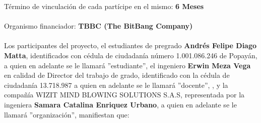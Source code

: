 Término de vinculación de cada partícipe en el mismo: \textbf{6 Meses} \\ \\

Organismo financiador: \textbf{TBBC (The BitBang Company)} \\ \\


Los participantes del proyecto, el estudiantes de pregrado \textbf{Andrés Felipe Diago Matta}, identificados con cédula de ciudadanía número 1.001.086.246 de Popayán, a quien en adelante se le llamará ''estudiante'', el ingeniero \textbf{Erwin Meza Vega} en calidad de Director del trabajo de grado, identificado con la cédula de ciudadanía 13.718.987 a quien en adelante se le llamará ''docente'', , y la compañía WIZIT MIND BLOWING SOLUTIONS S.A.S, representada por la ingeniera \textbf{Samara Catalina Enriquez Urbano}, a quien en adelante se le llamará ''organización'', manifiestan que: 

